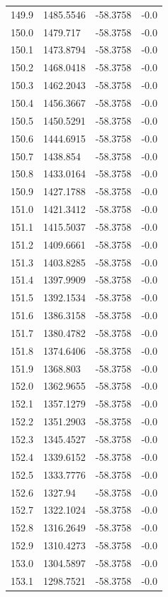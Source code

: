 \begin{table}[H]
\begin{tabular}{llll}
149.9 & 1485.5546 & -58.3758 & -0.0 \\
150.0 & 1479.717 & -58.3758 & -0.0 \\
150.1 & 1473.8794 & -58.3758 & -0.0 \\
150.2 & 1468.0418 & -58.3758 & -0.0 \\
150.3 & 1462.2043 & -58.3758 & -0.0 \\
150.4 & 1456.3667 & -58.3758 & -0.0 \\
150.5 & 1450.5291 & -58.3758 & -0.0 \\
150.6 & 1444.6915 & -58.3758 & -0.0 \\
150.7 & 1438.854 & -58.3758 & -0.0 \\
150.8 & 1433.0164 & -58.3758 & -0.0 \\
150.9 & 1427.1788 & -58.3758 & -0.0 \\
151.0 & 1421.3412 & -58.3758 & -0.0 \\
151.1 & 1415.5037 & -58.3758 & -0.0 \\
151.2 & 1409.6661 & -58.3758 & -0.0 \\
151.3 & 1403.8285 & -58.3758 & -0.0 \\
151.4 & 1397.9909 & -58.3758 & -0.0 \\
151.5 & 1392.1534 & -58.3758 & -0.0 \\
151.6 & 1386.3158 & -58.3758 & -0.0 \\
151.7 & 1380.4782 & -58.3758 & -0.0 \\
151.8 & 1374.6406 & -58.3758 & -0.0 \\
151.9 & 1368.803 & -58.3758 & -0.0 \\
152.0 & 1362.9655 & -58.3758 & -0.0 \\
152.1 & 1357.1279 & -58.3758 & -0.0 \\
152.2 & 1351.2903 & -58.3758 & -0.0 \\
152.3 & 1345.4527 & -58.3758 & -0.0 \\
152.4 & 1339.6152 & -58.3758 & -0.0 \\
152.5 & 1333.7776 & -58.3758 & -0.0 \\
152.6 & 1327.94 & -58.3758 & -0.0 \\
152.7 & 1322.1024 & -58.3758 & -0.0 \\
152.8 & 1316.2649 & -58.3758 & -0.0 \\
152.9 & 1310.4273 & -58.3758 & -0.0 \\
153.0 & 1304.5897 & -58.3758 & -0.0 \\
153.1 & 1298.7521 & -58.3758 & -0.0 \\

\end{tabular}
\end{table}

